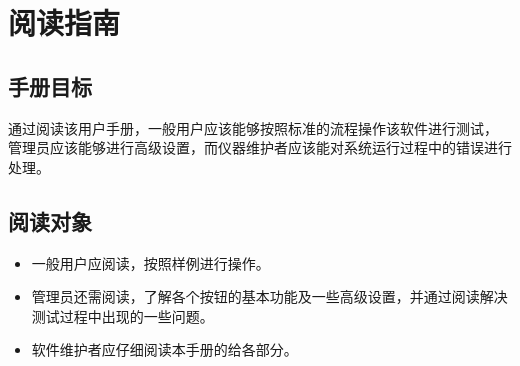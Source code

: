\chapter{阅读指南}
\section{手册目标}
通过阅读该用户手册，一般用户应该能够按照标准的流程操作该软件进行测试，
管理员应该能够进行高级设置，而仪器维护者应该能对系统运行过程中的错误进行处理。
\section{阅读对象}

\begin{itemize}
    \item 一般用户应阅读，按照样例进行操作。
    \item 管理员还需阅读，了解各个按钮的基本功能及一些高级设置，并通过阅读解决测试过程中出现的一些问题。
    \item 软件维护者应仔细阅读本手册的给各部分。
\end{itemize}


